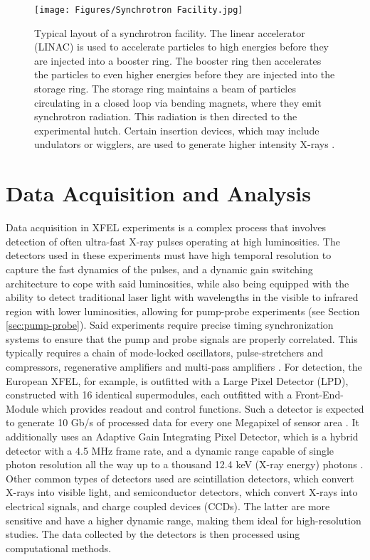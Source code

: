 \documentclass[aps,prb,twocolumn,superscriptaddress]{revtex4-2}
\begin{document}
\begin{figure}[h]
    \centering
    \texttt{[image: Figures/Synchrotron Facility.jpg]}
    \caption{Typical layout of a synchrotron facility. The linear accelerator
    (LINAC) is used to accelerate particles to high energies before they are
    injected into a booster ring. The booster ring then accelerates the
    particles to even higher energies before they are injected into the storage
    ring. The storage ring maintains a beam of particles circulating in a closed
    loop via bending magnets, where they emit synchrotron radiation. This
    radiation is then directed to the experimental hutch. Certain insertion 
    devices, which may include undulators or wigglers, are used to generate
    higher intensity X-rays \cite{Wiedemann2004}.}
    \label{fig:Undulator}
\end{figure}




\section{Data Acquisition and Analysis} \label{sec:data}
Data acquisition in XFEL experiments is a complex process that involves
detection of often ultra-fast X-ray pulses operating at high luminosities. The
detectors used in these experiments must have high temporal resolution to
capture the fast dynamics of the pulses, and a dynamic gain switching
architecture to cope with said luminosities, while also being equipped with the
ability to detect traditional laser light with wavelengths in the visible to
infrared region with lower luminosities, allowing for pump-probe experiments
(see Section \ref{sec:pump-probe}). Said experiments require precise timing
synchronization systems to ensure that the pump and probe signals are properly
correlated. This typically requires a chain of mode-locked oscillators,
pulse-stretchers and compressors, regenerative amplifiers and multi-pass
amplifiers \cite{Togashi2025}. For detection, the European XFEL, for example,
is outfitted with a Large Pixel Detector (LPD), constructed with 16 identical
supermodules, each outfitted with a Front-End-Module which provides readout and
control functions. Such a detector is expected to generate 10 Gb/s of processed
data for every one Megapixel of sensor area \cite{JCoughlan_2011}. It
additionally uses an Adaptive Gain Integrating Pixel Detector, which is a
hybrid detector with a 4.5 MHz frame rate, and a dynamic range capable of
single photon resolution all the way up to a thousand 12.4 keV (X-ray energy)
photons \cite{MEZZA2019162606}. Other common types of detectors used are
scintillation detectors, which convert X-rays into visible light, and
semiconductor detectors, which convert X-rays into electrical signals, and
charge coupled devices (CCDs). The
latter are more sensitive and have a higher dynamic range, making them ideal
for high-resolution studies. The data collected by the detectors is then
processed using computational methods.
\end{document}
